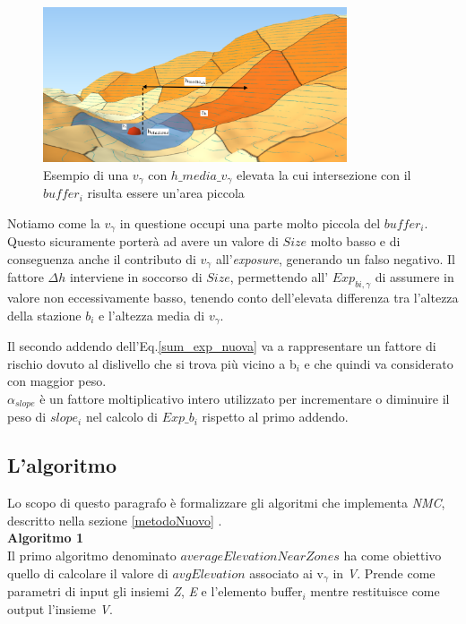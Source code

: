 \begin{figure}[bth]
  \centering
  \includegraphics[width=0.8\textwidth]{img/exDeltaH}
  \caption{Esempio di una $v_\gamma$ con $h\_media\_v_{\gamma}$ elevata la cui intersezione con il $buffer_i$ risulta essere un'area piccola } 
  \label{fig:exHmediaAlta}
\end{figure}

Notiamo come la $v_\gamma$ in questione occupi una parte molto piccola del $buffer_i$. Questo sicuramente porterà ad avere un valore di $Size$ molto basso e di conseguenza anche il contributo di $v_\gamma$ all'\textit{exposure}, generando un falso negativo. Il fattore $\Delta{h}$ interviene in soccorso di $Size$, permettendo all' $Exp_{bi,\gamma}$ di assumere in valore non eccessivamente basso, tenendo conto dell'elevata differenza tra l'altezza della stazione $b_i$ e l'altezza media di $v_\gamma$.

Il secondo addendo dell'Eq.\ref{sum_exp_nuova} va a rappresentare un fattore di rischio dovuto al dislivello che si trova più vicino a b$_i$ e che quindi va considerato con maggior peso.\\ 
$\alpha_{slope}$ è un fattore moltiplicativo intero utilizzato per incrementare o diminuire il peso  di $slope_i$ nel calcolo di $Exp\_b_i$ rispetto al primo addendo.\\ 

 


\subsection{L'algoritmo}
\label{algoritmonmc}
Lo scopo di questo paragrafo è formalizzare gli algoritmi che implementa \textit{NMC}, descritto nella sezione \ref{metodoNuovo} .\\ 
\newline
\newline
\textbf{Algoritmo 1}\\
\newline
Il primo algoritmo denominato $averageElevationNearZones$ ha come obiettivo quello di calcolare il valore di $avgElevation$ associato ai v$_\gamma$ in \textit{V}. Prende come parametri di input gli insiemi \textit{Z}, \textit{E} e l'elemento buffer$_i$ mentre restituisce come output l'insieme \textit{V}.\\

